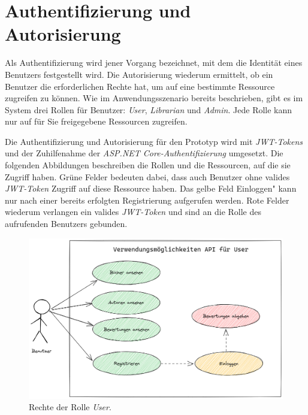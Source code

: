 \section{Authentifizierung und Autorisierung}
Als Authentifizierung wird jener Vorgang bezeichnet, mit dem die Identität eines Benutzers festgestellt wird.
Die Autorisierung wiederum ermittelt, ob ein Benutzer die erforderlichen Rechte hat, um auf eine bestimmte Ressource zugreifen zu können.
Wie im Anwendungsszenario bereits beschrieben, gibt es im System drei Rollen für Benutzer: \textit{User}, \textit{Librarian} und \textit{Admin}.
Jede Rolle kann nur auf für Sie freigegebene Ressourcen zugreifen.
\newline

Die Authentifizierung und Autorisierung für den Prototyp wird mit \textit{JWT-Tokens} und der Zuhilfenahme der \textit{ASP.NET Core-Authentifizierung} umgesetzt.
Die folgenden Abbildungen beschreiben die Rollen und die Ressourcen, auf die sie Zugriff haben.
Grüne Felder bedeuten dabei, dass auch Benutzer ohne valides \textit{JWT-Token} Zugriff auf diese Ressource haben.
Das gelbe Feld \glqq Einloggen" kann nur nach einer bereits erfolgten Registrierung aufgerufen werden.
Rote Felder wiederum verlangen ein valides \textit{JWT-Token} und sind an die Rolle des aufrufenden Benutzers gebunden.

\begin{figure}[H]
    \includegraphics[width=\textwidth]{pics/UseCaseUser.png}
    \caption{Rechte der Rolle \textit{User}.}
\end{figure}

